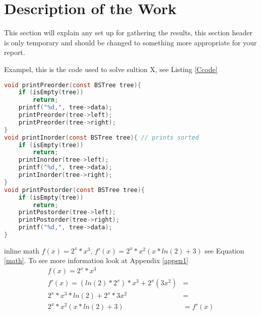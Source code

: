\section{Description of the Work}


This section will explain any set up for gathering the results, this section header is only temporary and should be changed to something more appropriate for your report.

Exampel, this is the code used to solve sultion X, see Listing \ref{Ccode}

\begin{lstlisting}[language=c,caption=some code,label=Ccode]
void printPreorder(const BSTree tree){
	if (isEmpty(tree))
		return;
	printf("%d,", tree->data);
	printPreorder(tree->left);
	printPreorder(tree->right);
}
void printInorder(const BSTree tree){ // prints sorted
	if (isEmpty(tree)) 
		return;
	printInorder(tree->left);
	printf("%d,", tree->data);
	printInorder(tree->right);
}
void printPostorder(const BSTree tree){
	if (isEmpty(tree)) 
		return;
	printPostorder(tree->left);
	printPostorder(tree->right);
	printf("%d,", tree->data);
}
\end{lstlisting}

inline math $f(x) = 2^x * x^3$,  $f'(x)=2^x*x^2(x*ln(2)+3)$ see Equation \ref{math}. To see more information look at Appendix \ref{appen1}\\

\begin{equation}
    \begin{aligned}
        f(x) = 2^x * x^3 & \\[5pt]
        f'(x) = (ln(2)*2^x)*x^3+2^x(3x^2) &= \\[5pt]
        2^x*x^3*ln(2)+2^x*3x^2 &= \\[5pt]
        2^x*x^2(x*ln(2)+3) &= f'(x)
    \end{aligned}
    \label{math}
\end{equation}

